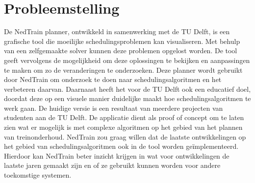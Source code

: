 \section{Probleemstelling}
\label{sec:probleemstelling}

De NedTrain planner, ontwikkeld in samenwerking met de TU Delft, is een grafische tool die moeilijke schedulingsproblemen kan visualiseren. Met behulp van een zelfgemaakte solver kunnen deze problemen opgelost worden.
De tool geeft vervolgens de mogelijkheid om deze oplossingen te bekijken en aanpassingen te maken om zo de veranderingen te onderzoeken. Deze planner wordt gebruikt door NedTrain om onderzoek te doen naar schedulingsalgoritmen en het verbeteren daarvan.
Daarnaast heeft het voor de TU Delft ook een educatief doel, doordat deze op een visuele manier duidelijke maakt hoe schedulingsalgoritmen te werk gaan. De huidige versie is een resultaat van meerdere projecten van studenten aan de TU Delft. De applicatie dient als proof of concept om te laten zien wat er mogelijk is met complexe algoritmen op het gebied van het plannen van treinonderhoud.
NedTrain zou graag willen dat de laatste ontwikkelingen op het gebied van schedulingsalgoritmen ook in de tool worden ge\"implementeerd. Hierdoor kan NedTrain beter inzicht krijgen in wat voor ontwikkelingen de laatste jaren gemaakt zijn en of ze gebruikt kunnen worden voor andere toekomstige systemen.